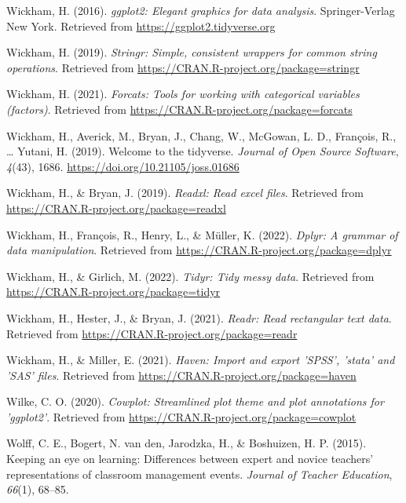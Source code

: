 \documentclass[
  man]{apa6}
\newlength{\cslhangindent}
\newenvironment{CSLReferences}[2] %
 {\begin{list}{}{%
  \setlength{\itemindent}{0pt}
  \setlength{\leftmargin}{0pt}
  \setlength{\parsep}{0pt}
  \ifodd #1
   \setlength{\leftmargin}{\cslhangindent}
   \setlength{\itemindent}{-1\cslhangindent}
  \fi
  \setlength{\itemsep}{#2\baselineskip}}}
 {\end{list}}
\begin{document}
\begin{CSLReferences}{1}{0}
Wickham, H. (2016). \emph{ggplot2: Elegant graphics for data analysis}. Springer-Verlag New York. Retrieved from \url{https://ggplot2.tidyverse.org}

Wickham, H. (2019). \emph{Stringr: Simple, consistent wrappers for common string operations}. Retrieved from \url{https://CRAN.R-project.org/package=stringr}

Wickham, H. (2021). \emph{Forcats: Tools for working with categorical variables (factors)}. Retrieved from \url{https://CRAN.R-project.org/package=forcats}

Wickham, H., Averick, M., Bryan, J., Chang, W., McGowan, L. D., François, R., \ldots{} Yutani, H. (2019). Welcome to the {tidyverse}. \emph{Journal of Open Source Software}, \emph{4}(43), 1686. \url{https://doi.org/10.21105/joss.01686}

Wickham, H., \& Bryan, J. (2019). \emph{Readxl: Read excel files}. Retrieved from \url{https://CRAN.R-project.org/package=readxl}

Wickham, H., François, R., Henry, L., \& Müller, K. (2022). \emph{Dplyr: A grammar of data manipulation}. Retrieved from \url{https://CRAN.R-project.org/package=dplyr}

Wickham, H., \& Girlich, M. (2022). \emph{Tidyr: Tidy messy data}. Retrieved from \url{https://CRAN.R-project.org/package=tidyr}

Wickham, H., Hester, J., \& Bryan, J. (2021). \emph{Readr: Read rectangular text data}. Retrieved from \url{https://CRAN.R-project.org/package=readr}

Wickham, H., \& Miller, E. (2021). \emph{Haven: Import and export 'SPSS', 'stata' and 'SAS' files}. Retrieved from \url{https://CRAN.R-project.org/package=haven}

Wilke, C. O. (2020). \emph{Cowplot: Streamlined plot theme and plot annotations for 'ggplot2'}. Retrieved from \url{https://CRAN.R-project.org/package=cowplot}

Wolff, C. E., Bogert, N. van den, Jarodzka, H., \& Boshuizen, H. P. (2015). Keeping an eye on learning: Differences between expert and novice teachers' representations of classroom management events. \emph{Journal of Teacher Education}, \emph{66}(1), 68--85.


\end{CSLReferences}
\end{document}
